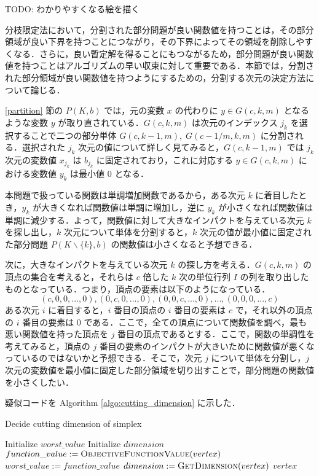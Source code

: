 \documentclass[a4paper,11pt]{jreport}
\begin{document}
TODO: わかりやすくなる絵を描く\par
分枝限定法において，分割された部分問題が良い関数値を持つことは，その部分領域が良い下界を持つことにつながり，その下界によってその領域を削除しやすくなる．さらに，良い暫定解を得ることにもつながるため，部分問題が良い関数値を持つことはアルゴリズムの早い収束に対して重要である．本節では，分割された部分領域が良い関数値を持つようにするための，分割する次元の決定方法について論じる．\par
\ref{partition} 節の $ P(K, b) $ では，元の変数 $ x $ の代わりに $ y \in G(c, k, m) $ となるような変数 $ y $ が取り直されている．$ G(c, k, m) $ は次元のインデックス $ j_k $ を選択することで二つの部分単体 $ G(c, k-1, m), \; G(c-1/m, k, m) $ に分割される．選択された $ j_k $ 次元の値について詳しく見てみると，$ G(c, k - 1, m) $ では $ j_k $ 次元の変数値 $x_{j_k} $ は $ b_{j_k} $ に固定されており，これに対応する $ y \in G(c, k, m) $ における変数値 $ y_k $ は最小値 $ 0 $ となる．\par
本問題で扱っている関数は単調増加関数であるから，ある次元 $ k $ に着目したとき，$ y_k $ が大きくなれば関数値は単調に増加し，逆に $ y_k $ が小さくなれば関数値は単調に減少する．よって，関数値に対して大きなインパクトを与えている次元 $ k $ を探し出し，$ k $ 次元について単体を分割すると，$ k $ 次元の値が最小値に固定された部分問題 $ P(K \backslash \{ k \}, b) $ の関数値は小さくなると予想できる．\par
次に，大きなインパクトを与えている次元 $ k $ の探し方を考える．$ G(c, k, m) $ の頂点の集合を考えると，それらは $ c $ 倍した $ k $ 次の単位行列 $ I $ の列を取り出したものとなっている．つまり，頂点の要素は以下のようになっている．
$$ (c, 0, 0, ..., 0), (0, c, 0, ..., 0), (0, 0, c, ..., 0), ..., (0, 0, 0, ..., c) $$
ある次元 $ i $ に着目すると，$ i $ 番目の頂点の $ i $ 番目の要素は $ c $ で，それ以外の頂点の $ i $ 番目の要素は $ 0 $ である．ここで，全ての頂点について関数値を調べ，最も悪い関数値を持った頂点を $ j $ 番目の頂点であるとする．ここで，関数の単調性を考えてみると，頂点の $ j $ 番目の要素のインパクトが大きいために関数値が悪くなっているのではないかと予想できる．そこで，次元 $ j $ について単体を分割し，$ j $ 次元の変数値を最小値に固定した部分領域を切り出すことで，部分問題の関数値を小さくしたい．\par
疑似コードを Algorithm \ref{algo:cutting_dimension} に示した．\par

\begin{algorithm}
\caption{Decide cutting dimension of simplex}
\label{algo:cutting_dimension}
\begin{algorithmic}[1]
\State Initialize $ worst\_value $
\State Initialize $ dimension $
\State $ function\_value := \Call{ObjectiveFunctionValue}{vertex} $
\State $ worst\_value := function\_value $
\State $ dimension := \Call{GetDimension}{vertex} $
\EndIf
\EndFor
\State \Return $ vertex $
\EndFunction
\end{algorithmic}
\end{algorithm}
\end{document}
